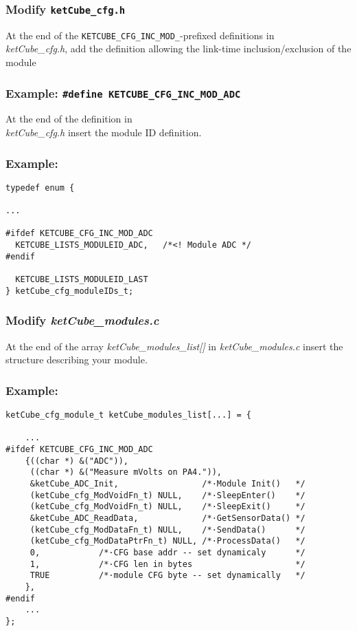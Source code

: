 \documentclass[twoside,a4paper]{refart}
\begin{document}
\subsubsection*{Modify {\tt ketCube\_cfg.h}}\label{sec:creation:core:cfg}

At the end of the {\tt KETCUBE\_CFG\_INC\_MOD\_}-prefixed definitions in\\{\it ketCube\_cfg.h}, add the definition allowing the link-time inclusion/exclusion of the module
\subsubsection*{Example: {\tt \#define KETCUBE\_CFG\_INC\_MOD\_ADC}}

At the end of the definition in\\{\it ketCube\_cfg.h} insert the module ID definition.
\subsubsection*{Example:}
\begin{verbatim}
typedef enum {

...

#ifdef KETCUBE_CFG_INC_MOD_ADC
  KETCUBE_LISTS_MODULEID_ADC,   /*<! Module ADC */
#endif

  KETCUBE_LISTS_MODULEID_LAST
} ketCube_cfg_moduleIDs_t;
\end{verbatim}

\subsubsection*{Modify {\it ketCube\_modules.c}}
At the end of the array {\it ketCube\_modules\_list[]} in {\it ketCube\_modules.c} insert the structure describing your module.
\subsubsection*{Example:}
\begin{verbatim}
ketCube_cfg_module_t ketCube_modules_list[...] = {
    
    ...
#ifdef KETCUBE_CFG_INC_MOD_ADC
    {((char *) &("ADC")),
     ((char *) &("Measure mVolts on PA4.")),
     &ketCube_ADC_Init,                 /*·Module Init()   */
     (ketCube_cfg_ModVoidFn_t) NULL,    /*·SleepEnter()    */
     (ketCube_cfg_ModVoidFn_t) NULL,    /*·SleepExit()     */
     &ketCube_ADC_ReadData,             /*·GetSensorData() */
     (ketCube_cfg_ModDataFn_t) NULL,    /*·SendData()      */
     (ketCube_cfg_ModDataPtrFn_t) NULL, /*·ProcessData()   */
     0,            /*·CFG base addr -- set dynamicaly      */
     1,            /*·CFG len in bytes                     */
     TRUE          /*·module CFG byte -- set dynamically   */
    },
#endif
    ...
};
\end{verbatim}
\end{document}
